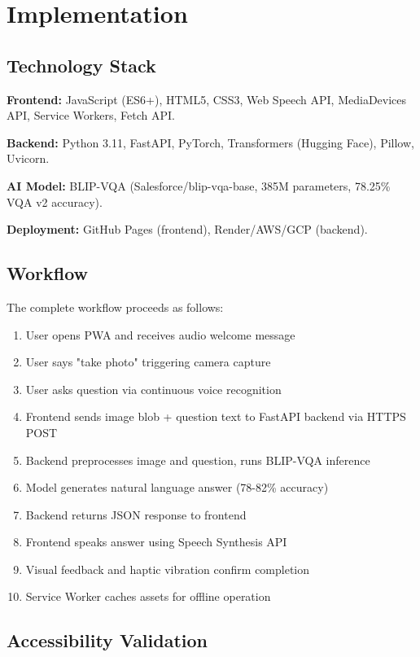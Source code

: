 \documentclass[conference]{IEEEtran}
\begin{document}
\section{Implementation}

\subsection{Technology Stack}

\textbf{Frontend:} JavaScript (ES6+), HTML5, CSS3, Web Speech API, MediaDevices API, Service Workers, Fetch API.

\textbf{Backend:} Python 3.11, FastAPI, PyTorch, Transformers (Hugging Face), Pillow, Uvicorn.

\textbf{AI Model:} BLIP-VQA (Salesforce/blip-vqa-base, 385M parameters, 78.25\% VQA v2 accuracy).

\textbf{Deployment:} GitHub Pages (frontend), Render/AWS/GCP (backend).

\subsection{Workflow}

The complete workflow proceeds as follows:

\begin{enumerate}
    \item User opens PWA and receives audio welcome message
    \item User says "take photo" triggering camera capture
    \item User asks question via continuous voice recognition
    \item Frontend sends image blob + question text to FastAPI backend via HTTPS POST
    \item Backend preprocesses image and question, runs BLIP-VQA inference
    \item Model generates natural language answer (78-82\% accuracy)
    \item Backend returns JSON response to frontend
    \item Frontend speaks answer using Speech Synthesis API
    \item Visual feedback and haptic vibration confirm completion
    \item Service Worker caches assets for offline operation
\end{enumerate}

\subsection{Accessibility Validation}
\end{document}
